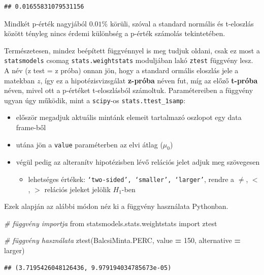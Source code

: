 \documentclass[
]{book}
\newenvironment{Shaded}{\begin{snugshade}}{\end{snugshade}}
\newcommand{\CommentTok}[1]{\textcolor[rgb]{0.56,0.35,0.01}{\textit{#1}}}
\newcommand{\DecValTok}[1]{\textcolor[rgb]{0.00,0.00,0.81}{#1}}
\newcommand{\ImportTok}[1]{#1}
\newcommand{\NormalTok}[1]{#1}
\newcommand{\OperatorTok}[1]{\textcolor[rgb]{0.81,0.36,0.00}{\textbf{#1}}}
\newcommand{\StringTok}[1]{\textcolor[rgb]{0.31,0.60,0.02}{#1}}
\providecommand{\tightlist}{%
  \setlength{\itemsep}{0pt}\setlength{\parskip}{0pt}}
\begin{document}
\begin{verbatim}
## 0.01655831079531156
\end{verbatim}

Mindkét p-érték nagyjából \(0.01\%\) körüli, szóval a standard normális és t-eloszlás között tényleg nincs érdemi különbség a p-érték számolás tekintetében.

Természetesen, mindez beépített függvénnyel is meg tudjuk oldani, csak ez most a \texttt{statsmodels} csomag \texttt{stats.weightstats} moduljában lakó \texttt{ztest} függvény lesz. A név (z test = z próba) onnan jön, hogy a standard ormális eloszlás jele a matekban \(z\), így ez a hipotézisvizsgálat \textbf{z-próba} néven fut, míg az előző \textbf{t-próba} néven, mivel ott a p-értéket t-eloszlásból számoltuk.
Paramétereiben a függvény ugyan úgy működik, mint a \texttt{scipy}-os \texttt{stats.ttest\_1samp}:

\begin{itemize}
\tightlist
\item
  először megadjuk aktuális mintánk elemeit tartalmazó oszlopot egy data frame-ből
\item
  utána jön a \texttt{value} paraméterben az elvi átlag (\(\mu_0\))
\item
  végül pedig az alteranítv hipotézisben lévő relációs jelet adjuk meg szövegesen

  \begin{itemize}
  \tightlist
  \item
    lehetséges értékek: \texttt{‘two-sided’,\ ‘smaller’,\ ‘larger’}, rendre a \(\neq\), \(<\), \(>\) relációs jeleket jelölik \(H_1\)-ben
  \end{itemize}
\end{itemize}

Ezek alapján az alábbi módon néz ki a függvény használata Pythonban.

\begin{Shaded}
\begin{Highlighting}[]
\CommentTok{\# függvény importja}
\ImportTok{from}\NormalTok{ statsmodels.stats.weightstats }\ImportTok{import}\NormalTok{ ztest}

\CommentTok{\# függvény használata}
\NormalTok{ztest(BalcsiMinta.PERC, value }\OperatorTok{=} \DecValTok{150}\NormalTok{, alternative }\OperatorTok{=} \StringTok{\textquotesingle{}larger\textquotesingle{}}\NormalTok{)}
\end{Highlighting}
\end{Shaded}

\begin{verbatim}
## (3.7195426048126436, 9.979194034785673e-05)
\end{verbatim}
\end{document}

